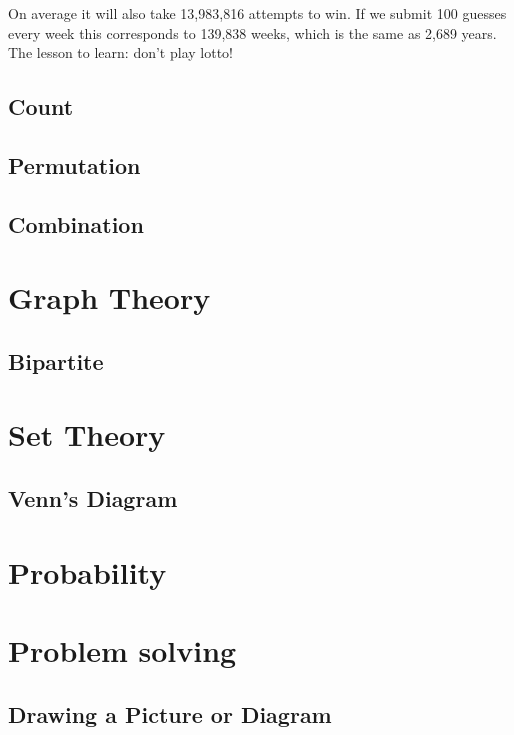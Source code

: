On average it will also take 13,983,816 attempts to win. If we submit 100 guesses every week this corresponds to
139,838 weeks, which is the same as 2,689 years. The lesson to learn: don’t play lotto!


\section{Count}
\label{sec:count}

\section{Permutation}
\label{sec:permutation}

\section{Combination}
\label{sec:combination}



\chapter{Graph Theory}
\label{chap:graph-theory}

\section{Bipartite}
\label{sec:bipartite}




\chapter{Set Theory}
\label{chap:set-theory}

\section{Venn's Diagram}
\label{sec:venn's-diagram}



\chapter{Probability}
\label{chap:probability}

\chapter{Problem solving}
\label{chap:problem-solving}

\section{Drawing a Picture or Diagram}
\label{sec:drawing-a-picture-or-diagram}

